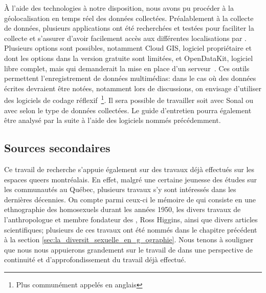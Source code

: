 À l'aide des technologies à notre disposition, nous avons pu procéder à la géolocalisation en temps réel des données collectées. 
Préalablement à la collecte de données, plusieurs applications ont été recherchées et testées pour faciliter la collecte et s'assurer d'avoir facilement accès aux différentes localisations par \gps. 
Plusieurs options sont possibles, notamment Cloud GIS, logiciel propriétaire et dont les options dans la version gratuite sont limitées, et OpenDataKit, logiciel libre complet, mais qui demanderait la mise en place d'un serveur~\citep{OpenDataKit2014}. 
Ces outils permettent l'enregistrement de données multimédias: dans le cas où des données écrites devraient être notées, notamment lors de discussions, on envisage d'utiliser des logiciels de codage réflexif~\footnote{Plus communément appelés en anglais   \cadqas}. 
Il sera possible de travailler soit avec Sonal ou avec \rqda{} selon le type de données collectées. 
Le guide d'entretien pourra également être analysé par la suite à l'aide des logiciels nommés précédemment.

\subsection{Sources secondaires}
\label{sub:sources_secondaires}
Ce travail de recherche s'appuie également sur des travaux déjà effectués sur les espaces queers montréalais. 
En effet, malgré une certaine jeunesse des études sur les communautés \lgbt{} au Québec, plusieurs travaux s'y sont intéressés dans les dernières décennies. 
On compte parmi ceux-ci le mémoire de \cite{Leznoff1954} qui consiste en une ethnographie des homosexuels durant les années 1950, les divers travaux de l'anthropologue et membre fondateur des \agq{}, Ross Higgins, ainsi que divers articles scientifiques; plusieurs de ces travaux ont été nommés dans le chapitre précédent à la section \ref{sec:la_diversit_sexuelle_en_g_ographie}. 
Nous tenons à souligner que nous nous appuierons grandement sur le travail de \citep{Giraud2014} dans une perspective de continuité et d'approfondissement du travail déjà effectué.

